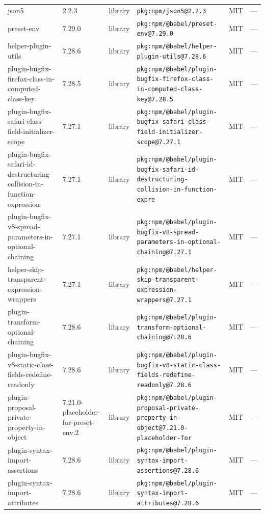 \documentclass[11pt,a4paper]{article}
\begin{document}
\begin{longtable}{|p{4cm}|p{2cm}|p{1.6cm}|p{5cm}|p{1.5cm}|p{3.5cm}|}
\raggedright json5 & 2.2.3 & library & \small\texttt{pkg:npm/json5@2.2.3} & MIT & \small — \\
\raggedright preset-env & 7.29.0 & library & \small\texttt{pkg:npm/@babel/preset-env@7.29.0} & MIT & \small — \\
\raggedright helper-plugin-utils & 7.28.6 & library & \small\texttt{pkg:npm/@babel/helper-plugin-utils@7.28.6} & MIT & \small — \\
\raggedright plugin-bugfix-firefox-class-in-computed-class-key & 7.28.5 & library & \small\texttt{pkg:npm/@babel/plugin-bugfix-firefox-class-in-computed-class-key@7.28.5} & MIT & \small — \\
\raggedright plugin-bugfix-safari-class-field-initializer-scope & 7.27.1 & library & \small\texttt{pkg:npm/@babel/plugin-bugfix-safari-class-field-initializer-scope@7.27.1} & MIT & \small — \\
\raggedright plugin-bugfix-safari-id-destructuring-collision-in-function-expression & 7.27.1 & library & \small\texttt{pkg:npm/@babel/plugin-bugfix-safari-id-destructuring-collision-in-function-expre} & MIT & \small — \\
\raggedright plugin-bugfix-v8-spread-parameters-in-optional-chaining & 7.27.1 & library & \small\texttt{pkg:npm/@babel/plugin-bugfix-v8-spread-parameters-in-optional-chaining@7.27.1} & MIT & \small — \\
\raggedright helper-skip-transparent-expression-wrappers & 7.27.1 & library & \small\texttt{pkg:npm/@babel/helper-skip-transparent-expression-wrappers@7.27.1} & MIT & \small — \\
\raggedright plugin-transform-optional-chaining & 7.28.6 & library & \small\texttt{pkg:npm/@babel/plugin-transform-optional-chaining@7.28.6} & MIT & \small — \\
\raggedright plugin-bugfix-v8-static-class-fields-redefine-readonly & 7.28.6 & library & \small\texttt{pkg:npm/@babel/plugin-bugfix-v8-static-class-fields-redefine-readonly@7.28.6} & MIT & \small — \\
\raggedright plugin-proposal-private-property-in-object & 7.21.0-placeholder-for-preset-env.2 & library & \small\texttt{pkg:npm/@babel/plugin-proposal-private-property-in-object@7.21.0-placeholder-for} & MIT & \small — \\
\raggedright plugin-syntax-import-assertions & 7.28.6 & library & \small\texttt{pkg:npm/@babel/plugin-syntax-import-assertions@7.28.6} & MIT & \small — \\
\raggedright plugin-syntax-import-attributes & 7.28.6 & library & \small\texttt{pkg:npm/@babel/plugin-syntax-import-attributes@7.28.6} & MIT & \small — \\

\end{longtable}
\end{document}
